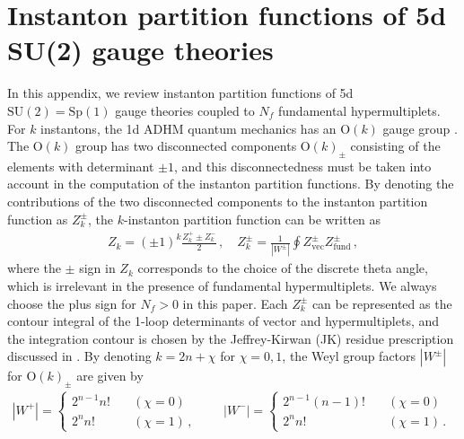 \documentclass[11pt, a4paper]{article}
\theoremstyle{definition}
\begin{document}
\section{Instanton partition functions of 5d SU(2) gauge theories} \label{app:adhm}

In this appendix, we review instanton partition functions of 5d $ \mathrm{SU}(2) = \mathrm{Sp}(1) $ gauge theories coupled to $ N_f $ fundamental hypermultiplets. For $ k $ instantons, the 1d ADHM quantum mechanics has an $ \mathrm{O}(k) $ gauge group \cite{Shadchin:2005mx, Kim:2012gu, Hwang:2014uwa}. The $ \mathrm{O}(k) $ group has two disconnected components $ \mathrm{O}(k)_\pm $ consisting of the elements with determinant $ \pm 1 $, and this disconnectedness must be taken into account in the computation of the instanton partition functions. By denoting the contributions of the two disconnected components to the instanton partition function as $ Z_k^\pm $, the $ k $-instanton partition function can be written as
\begin{align}\label{eq:ADHM}
    Z_k = (\pm 1)^k \frac{Z_k^+ \pm Z_k^-}{2} \, , \quad
    Z_k^\pm = \frac{1}{|W^\pm|} \oint Z_{\mathrm{vec}}^\pm Z_{\mathrm{fund}}^{\pm} \, ,
\end{align}
where the $ \pm $ sign in $ Z_k $ corresponds to the choice of the discrete theta angle, which is irrelevant in the presence of fundamental hypermultiplets. We always choose the plus sign for $ N_f > 0 $ in this paper. Each $ Z_k^\pm $ can be represented as the contour integral of the 1-loop determinants of vector and hypermultiplets, and the integration contour is chosen by the Jeffrey-Kirwan (JK) residue prescription discussed in \cite{Benini:2013nda, Benini:2013xpa}. By denoting $ k=2n+\chi $ for $ \chi=0,1 $, the Weyl group factors $ |W^\pm| $ for $ \mathrm{O}(k)_\pm $ are given by
\begin{align}
    |W^+| = \left\{ \begin{array}{ll}
            \displaystyle {2^{n-1}n!} & \quad (\chi=0) \\[1em]
            \displaystyle {2^{n}n!} & \quad (\chi=1) \, ,
        \end{array}\right. \qquad
    |W^-| = \left\{ \begin{array}{ll}
            \displaystyle {2^{n-1}(n-1)!} & \quad (\chi=0) \\[1em]
            \displaystyle {2^{n}n!} & \quad (\chi=1) \, .
        \end{array}\right. \qquad
\end{align}
\end{document}

